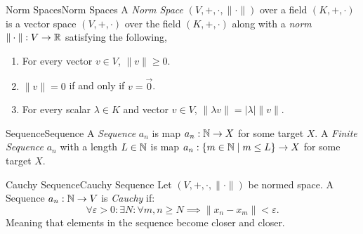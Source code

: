\documentclass{article}
\begin{document}
\begin{definition}{Norm Spaces}{Norm Spaces}
    A \emph{Norm Space} $\left(V, +, \cdot, \|\cdot\|\right)$ over a field $\left(K, +, \cdot\right)$
    is a vector space $\left(V, +, \cdot\right)$ over the field $\left(K, +, \cdot\right)$ along with a \emph{norm} $\|\cdot\| : V \to \mathbb{R}$  satisfying the following,

    \begin{enumerate}[label=(\roman*)]
        \item For every vector $v \in V$, $\|v\| \geq 0$.
        \item $\|v\| = 0$ if and only if $v = \vec{0}$.
        \item For every scalar $\lambda \in K$ and vector $v \in V$, $\|\lambda v\| = |\lambda|\|v\|$.
    \end{enumerate}
\end{definition}

\begin{definition}{Sequence}{Sequence}
    A \emph{Sequence} $a_n$ is map $a_n : \mathbb{N} \to X$ for some target $X$.
    A \emph{Finite Sequence} $a_n$ with a length $L \in \mathbb{N}$ is map $a_n : \{m \in \mathbb{N} \mid m \leq L\} \to X$ for some target $X$.
\end{definition}

\begin{definition}{Cauchy Sequence}{Cauchy Sequence}
    Let $\left(V, +, \cdot, \|\cdot\|\right)$ be normed space.
    A Sequence $a_n: \mathbb{N} \to V$ is \emph{Cauchy} if:
    $$\forall \varepsilon > 0 : \exists N : \forall m, n \geq N \implies \|x_n - x_m\| < \varepsilon.$$
    Meaning that elements in the sequence become closer and closer.
\end{definition}
\end{document}
